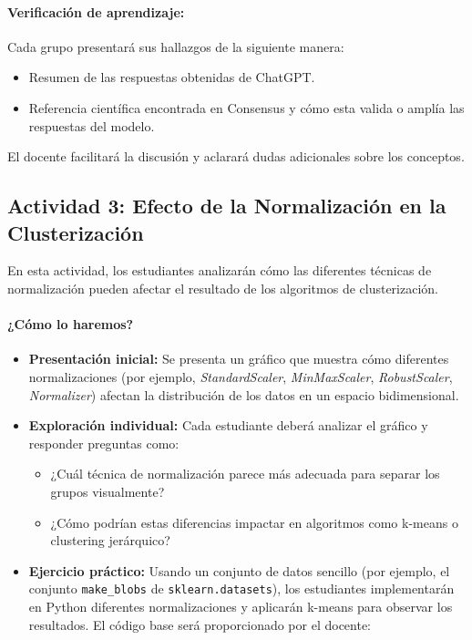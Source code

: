\documentclass[a4,11pt]{aleph-notas}
\begin{document}
\paragraph{Verificación de aprendizaje:}  
Cada grupo presentará sus hallazgos de la siguiente manera:
\begin{itemize}[leftmargin=*]
    \item Resumen de las respuestas obtenidas de ChatGPT.
    \item Referencia científica encontrada en Consensus y cómo esta valida o amplía las respuestas del modelo.
\end{itemize}
El docente facilitará la discusión y aclarará dudas adicionales sobre los conceptos.

\subsection*{Actividad 3: Efecto de la Normalización en la Clusterización}

En esta actividad, los estudiantes analizarán cómo las diferentes técnicas de normalización pueden afectar el resultado de los algoritmos de clusterización.

\paragraph{¿Cómo lo haremos?}  
\begin{itemize}[leftmargin=*]
    \item \textbf{Presentación inicial:}  
    Se presenta un gráfico que muestra cómo diferentes normalizaciones (por ejemplo, \textit{StandardScaler}, \textit{MinMaxScaler}, \textit{RobustScaler}, \textit{Normalizer}) afectan la distribución de los datos en un espacio bidimensional.
    
    \item \textbf{Exploración individual:}  
    Cada estudiante deberá analizar el gráfico y responder preguntas como:
    \begin{itemize}
        \item ¿Cuál técnica de normalización parece más adecuada para separar los grupos visualmente?
        \item ¿Cómo podrían estas diferencias impactar en algoritmos como k-means o clustering jerárquico?
    \end{itemize}

    \item \textbf{Ejercicio práctico:}  
    Usando un conjunto de datos sencillo (por ejemplo, el conjunto \texttt{make\_blobs} de \texttt{sklearn.datasets}), los estudiantes implementarán en Python diferentes normalizaciones y aplicarán k-means para observar los resultados. El código base será proporcionado por el docente:
\end{itemize}
\end{document}
